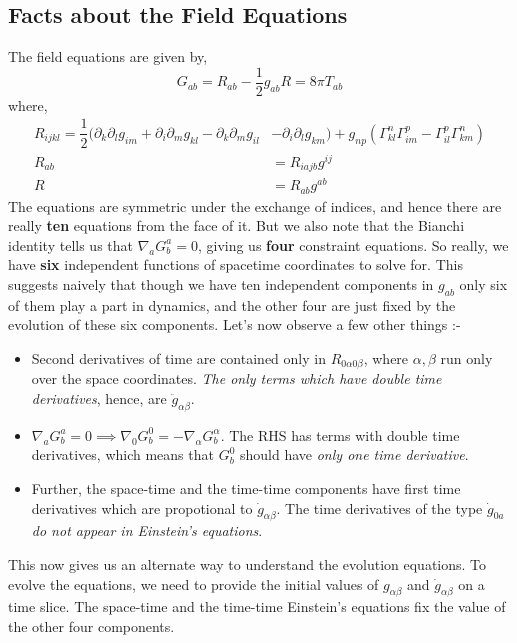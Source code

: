 \documentclass[a4paper,11pt]{article}
\begin{document}
\subsection{Facts about the Field Equations}
The field equations are given by,
\begin{equation*}
G_{ab}  = R_{ab} - \dfrac{1}{2} g_{ab} R = 8 \pi T_{ab}
\end{equation*}
where,
\begin{align*}
R_{ijkl} = \dfrac{1}{2} (\partial_k \partial_l g_{im}  + \partial_i \partial_m g_{kl} - \partial_k \partial_m g_{il} &- \partial_i \partial_l g_{km}) + g_{np} (\Gamma^n_{kl} \Gamma^p_{im} - \Gamma^p_{il} \Gamma^n_{km}) \\
R_{ab} &= R_{iajb} g^{ij} \\
R &= R_{ab} g^{ab}
\end{align*}
The equations are symmetric under the exchange of indices, and hence there are really \textbf{ten} equations from the face of it. But we also note that the Bianchi identity tells us that $ \nabla_a G^a_{b} = 0 $, giving us \textbf{four} constraint equations. So really, we have \textbf{six} independent functions of spacetime coordinates to solve for. This suggests naively that though we have ten independent components in $ g_{ab} $ only six of them play a part in dynamics, and the other four are just fixed by the evolution of these six components. Let's now observe a few other things :-

\begin{itemize}
	\item Second derivatives of time are contained only in $ R_{0 \alpha 0 \beta} $, where $ \alpha, \beta $ run only over the space coordinates. \textit{The only terms which have double time derivatives}, hence, are $ \ddot{g}_{\alpha \beta} $.
	\item $ \nabla_a G^a_{b} = 0 \implies \nabla_0 G^0_{b} =-  \nabla_\alpha G^\alpha_{b}  $. The RHS has terms with double time derivatives, which means that $ G^0_{b} $ should have \textit{only one time derivative}.
	\item Further, the space-time and the time-time components have first time derivatives which are propotional to $ \dot{g}_{\alpha \beta} $. The time derivatives of the type $ \dot{g}_{0 a} $ \textit{do not appear in Einstein's equations}.
\end{itemize}
This now gives us an alternate way to understand the evolution equations. To evolve the equations, we need to provide the initial values of $ g_{\alpha \beta} $ and $ \dot{g}_{\alpha \beta} $ on a time slice. The space-time and the time-time Einstein's equations fix the value of the other four components.
\end{document}
